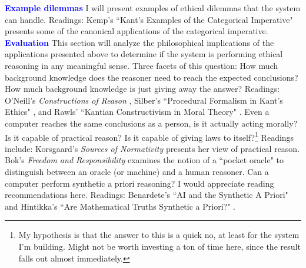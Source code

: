 \documentclass[11pt]{article}
\begin{document}
\begin{outline}[enumerate]
\2 \textcolor{blue}{\textbf{Example dilemmas}} I will present examples of ethical dilemmas that the system can handle. Readings: Kemp's ``Kant's Examples of the Categorical Imperative" presents some of the canonical applications of the categorical imperative. 
\3 \textcolor{blue}{\textbf{Evaluation}} This section will analyze the philosophical implications of the applications presented above to determine if the system is performing ethical reasoning in any meaningful sense. Three facets of this question:
\4 How much background knowledge does the reasoner need to reach the expected conclusions? How much background knowledge is just giving away the answer? Readings: O'Neill's \emph{Constructions of Reason} \cite{constofreason}, Silber's ``Procedural Formalism in Kant’s Ethics" \cite{silber}, and Rawls' ``Kantian Constructivism in Moral Theory" \cite{rawlsconstructivism}.
\4 Even a computer reaches the same conclusions as a person, is it actually acting morally? Is it capable of practical reason? Is it capable of giving laws to itself?\footnote{My hypothesis is that the answer to this is a quick no, at least for the system I'm building. Might not be worth investing a ton of time here, since the result falls out almost immediately.} Readings include: Korsgaard's \emph{Sources of Normativity} \cite{sources} presents her view of practical reason. Bok's \emph{Freedom and Responsibility} \cite{bok} examines the notion of a ``pocket oracle" to distinguish between an oracle (or machine) and a human reasoner. 
\4 Can a computer perform synthetic a priori reasoning? I would appreciate reading recommendations here. Readings: Benardete's ``AI and the Synthetic A Priori" \cite{benardete} and Hintikka's ``Are Mathematical Truths Synthetic a Priori?" \cite{hintikkaapriori}.


\end{outline}
\end{document}
